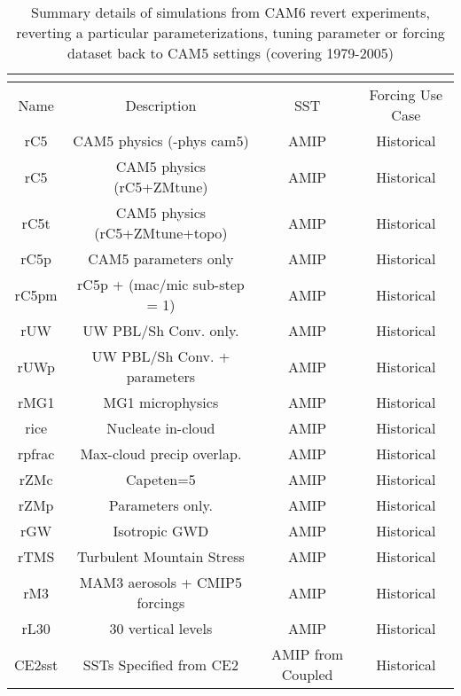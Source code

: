\begin{table}[t]
\caption{Summary details of simulations from CAM6 revert experiments, reverting a particular parameterizations, tuning parameter or forcing dataset back to CAM5 settings (covering 1979-2005)}\label{t1}
\begin{center}
\begin{tabular}{cccc}
\multicolumn{3}{l}{} \\
\hline
Name & Description & SST  & Forcing Use Case \\
\hline
rC5    & CAM5 physics (-phys cam5)     & AMIP & Historical   \\
rC5   & CAM5 physics (rC5+ZMtune)      & AMIP & Historical   \\
rC5t   & CAM5 physics (rC5+ZMtune+topo)& AMIP & Historical   \\
rC5p   & CAM5 parameters only          & AMIP & Historical  \\
rC5pm  & rC5p + (mac/mic sub-step = 1) & AMIP & Historical  \\
rUW    & UW PBL/Sh Conv. only.         & AMIP & Historical  \\
rUWp   & UW PBL/Sh Conv. + parameters  & AMIP & Historical  \\
rMG1   & MG1 microphysics              & AMIP & Historical  \\
rice   & Nucleate in-cloud             & AMIP & Historical  \\
rpfrac & Max-cloud precip overlap.     & AMIP & Historical  \\
rZMc   & Capeten=5                     & AMIP & Historical  \\
rZMp   & Parameters only.              & AMIP & Historical  \\
rGW    & Isotropic GWD                 & AMIP & Historical \\
rTMS   & Turbulent Mountain Stress     & AMIP & Historical \\
rM3    & MAM3 aerosols + CMIP5 forcings& AMIP & Historical \\
rL30   & 30 vertical levels            & AMIP & Historical \\
CE2sst & SSTs Specified from CE2       & AMIP from Coupled & Historical \\
\hline
\end{tabular}
\end{center}
\end{table}


